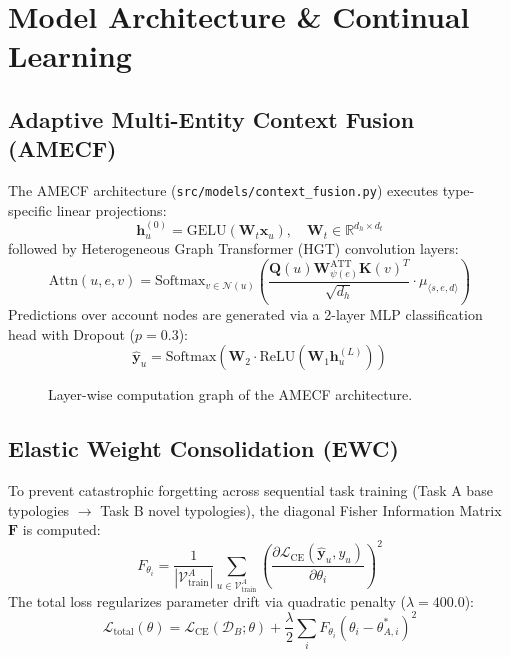 \documentclass[conference]{IEEEtran}
\begin{document}
\section{Model Architecture \& Continual Learning}

\subsection{Adaptive Multi-Entity Context Fusion (AMECF)}
The AMECF architecture (\texttt{src/models/context\_fusion.py}) executes type-specific linear projections:
\begin{equation}
\mathbf{h}_u^{(0)} = \text{GELU}\left(\mathbf{W}_t \mathbf{x}_u\right), \quad \mathbf{W}_t \in \mathbb{R}^{d_h \times d_t}
\label{eq:proj}
\end{equation}
followed by Heterogeneous Graph Transformer (HGT) convolution layers:
\begin{equation}
\text{Attn}(u, e, v) = \text{Softmax}_{v \in \mathcal{N}(u)}\left( \frac{\mathbf{Q}(u) \mathbf{W}_{\psi(e)}^{\text{ATT}} \mathbf{K}(v)^T}{\sqrt{d_h}} \cdot \mu_{\langle s, e, d \rangle} \right)
\label{eq:hgt_attn}
\end{equation}
Predictions over account nodes are generated via a 2-layer MLP classification head with Dropout ($p=0.3$):
\begin{equation}
\hat{\mathbf{y}}_u = \text{Softmax}\left(\mathbf{W}_2 \cdot \text{ReLU}\left(\mathbf{W}_1 \mathbf{h}_u^{(L)}\right)\right)
\label{eq:mlp_head}
\end{equation}

\begin{figure}[htbp]
\centering
{}
\caption{Layer-wise computation graph of the AMECF architecture.}
\label{fig:layer}
\end{figure}

\subsection{Elastic Weight Consolidation (EWC)}
To prevent catastrophic forgetting across sequential task training (Task A base typologies $\to$ Task B novel typologies), the diagonal Fisher Information Matrix $\mathbf{F}$ is computed:
\begin{equation}
F_{\theta_i} = \frac{1}{|\mathcal{V}_{\text{train}}^A|} \sum_{u \in \mathcal{V}_{\text{train}}^A} \left( \frac{\partial \mathcal{L}_{\text{CE}}(\hat{\mathbf{y}}_u, y_u)}{\partial \theta_i} \right)^2
\label{eq:diag_fisher}
\end{equation}
The total loss regularizes parameter drift via quadratic penalty ($\lambda = 400.0$):
\begin{equation}
\mathcal{L}_{\text{total}}(\theta) = \mathcal{L}_{\text{CE}}(\mathcal{D}_B; \theta) + \frac{\lambda}{2} \sum_{i} F_{\theta_i} (\theta_i - \theta_{A, i}^*)^2
\label{eq:ewc_loss}
\end{equation}
\end{document}
